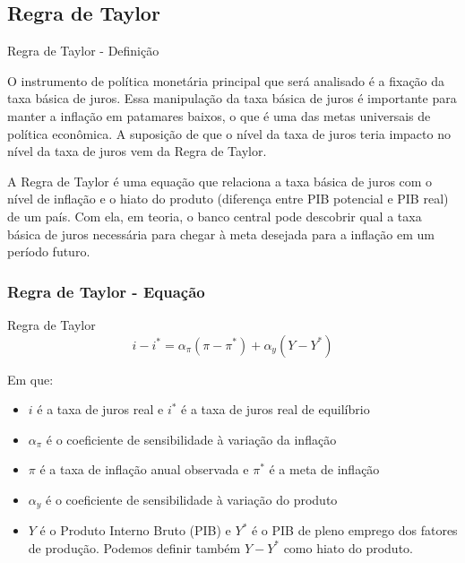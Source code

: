 \documentclass[xcolor=dvipsnames]{beamer}
\begin{document}
\subsection{Regra de Taylor}
\begin{frame}{Regra de Taylor - Definição}
    
O instrumento de política monetária principal que será analisado é a fixação da taxa básica de juros. Essa manipulação da taxa básica de juros é importante para manter a inflação em patamares baixos, o que é uma das metas universais de política econômica. A suposição de que o nível da taxa de juros teria impacto no nível da taxa de juros vem da Regra de Taylor. 

A Regra de Taylor é uma equação que relaciona a taxa básica de juros com o nível de inflação e o hiato do produto (diferença entre PIB potencial e PIB real) de um país. Com ela, em teoria, o banco central pode descobrir qual a taxa básica de juros necessária para chegar à meta desejada para a inflação em um período futuro.
\end{frame}
\begin{frame}[t]
\frametitle{Regra de Taylor - Equação}
\begin{alertblock}{Regra de Taylor}
\begin{equation}
    i - i^{*} = \alpha_{\pi}(\pi - \pi^{*}) + \alpha_{y}(Y - Y^{*})
\end{equation}
\end{alertblock}
Em que:
\begin{itemize}
    \item $i$ é a taxa de juros real e $i^{*}$ é a taxa de juros real de equilíbrio
    \item $\alpha_{\pi}$ é o coeficiente de sensibilidade à variação da inflação
    \item $\pi$ é a taxa de inflação anual observada e $\pi^{*}$ é a meta de inflação
    \item $\alpha_{y}$ é o coeficiente de sensibilidade à variação do produto 
    \item $Y$ é o Produto Interno Bruto (PIB) e $Y^{*}$ é o PIB de pleno emprego dos fatores de produção. Podemos definir também $Y - Y^{*}$ como hiato do produto.
\end{itemize}
\end{frame}
\end{document}
